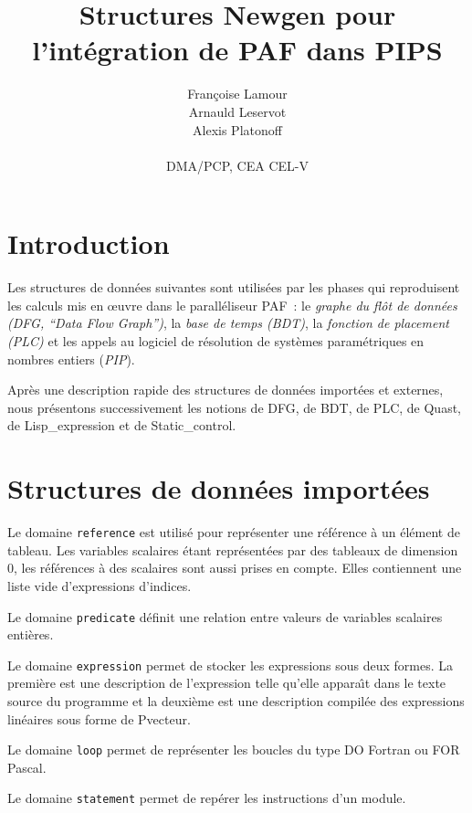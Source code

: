 \documentclass{article}
\title{Structures Newgen pour l'int\'egration de PAF dans PIPS}
\author{Fran\c{c}oise Lamour \\
        Arnauld Leservot \\
        Alexis Platonoff \\
        \\
        DMA/PCP, CEA CEL-V}
\begin{document}
\maketitle

\section*{Introduction}

Les structures de donn\'ees suivantes sont utilis\'ees par les phases qui 
reproduisent les calculs mis en \oe uvre dans le parall\'eliseur PAF~: le {\em 
graphe du fl\^ot de donn\'ees (DFG, ``Data Flow Graph'')}, la {\em base de 
temps (BDT)}, la {\em fonction de placement (PLC)} et les appels au logiciel de
r\'esolution de syst\`emes param\'etriques en nombres entiers ({\em PIP}).

Apr\`es une description rapide des structures de donn\'ees import\'ees et 
externes, nous pr\'esentons successivement les notions de DFG, de BDT, de PLC, 
de Quast, de Lisp\_expression et de Static\_control.

\section{Structures de donn\'ees import\'ees}

{Le domaine {\tt reference} est utilis\'e pour repr\'esenter une r\'ef\'erence 
\`a un \'el\'ement de tableau. Les variables scalaires \'etant repr\'esent\'ees
par des tableaux de dimension 0, les r\'ef\'erences \`a des scalaires sont 
aussi prises en compte. Elles contiennent une liste vide d'expressions 
d'indices.}

{Le domaine {\tt predicate} d\'efinit une relation entre valeurs de variables 
scalaires enti\`eres.}

{Le domaine {\tt expression} permet de stocker les expressions sous deux 
formes. La premi\`ere est une description de l'expression telle qu'elle 
appara\^{\i}t dans le texte source du programme et la deuxi\`eme est une 
description compil\'ee des expressions lin\'eaires sous forme de Pvecteur.}

{Le domaine {\tt loop} permet de repr\'esenter les boucles du type DO Fortran ou
FOR Pascal.}

{Le domaine {\tt statement} permet de rep\'erer les instructions d'un module.}
\end{document}
